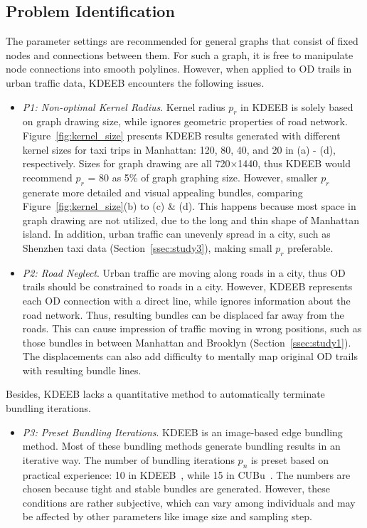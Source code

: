 \subsection{Problem Identification}
The parameter settings are recommended for general graphs that consist of fixed nodes and connections between them.
For such a graph, it is free to manipulate node connections into smooth polylines.
However, when applied to OD trails in urban traffic data, KDEEB encounters the following issues.

\begin{itemize}
\item
\textit{P1: Non-optimal Kernel Radius}.
Kernel radius $p_r$ in KDEEB is solely based on graph drawing size, while ignores geometric properties of road network.
Figure~\ref{fig:kernel_size} presents KDEEB results generated with different kernel sizes for taxi trips in Manhattan: 120, 80, 40, and 20 in (a) - (d), respectively.
Sizes for graph drawing are all 720$\times$1440, thus KDEEB would recommend $p_r$ = 80 as 5\% of graph graphing size.
However, smaller $p_r$ generate more detailed and visual appealing bundles, comparing Figure~\ref{fig:kernel_size}(b) to (c) \& (d).
This happens because most space in graph drawing are not utilized, due to the long and thin shape of Manhattan island.
In addition, urban traffic can unevenly spread in a city, such as Shenzhen taxi data (Section~\ref{ssec:study3}), making small $p_r$ preferable.

\vspace{1mm}
\item
\textit{P2: Road Neglect}.
Urban traffic are moving along roads in a city, thus OD trails should be constrained to roads in a city.
However, KDEEB represents each OD connection with a direct line, while ignores information about the road network.
Thus, resulting bundles can be displaced far away from the roads.
This can cause impression of traffic moving in wrong positions, such as those bundles in between Manhattan and Brooklyn (Section~\ref{ssec:study1}).
The displacements can also add difficulty to mentally map original OD trails with resulting bundle lines.
\end{itemize}

\vspace{2mm}
\noindent
Besides, KDEEB lacks a quantitative method to automatically terminate bundling iterations.

\begin{itemize}
\item
\textit{P3: Preset Bundling Iterations}.
KDEEB is an image-based edge bundling method. 
Most of these bundling methods generate bundling results in an iterative way. 
The number of bundling iterations $p_n$ is preset based on practical experience: 10 in KDEEB~\cite{hurter2012graph}, while 15 in CUBu~\cite{van2016cubu}.
The numbers are chosen because tight and stable bundles are generated.
However, these conditions are rather subjective, which can vary among individuals and may be affected by other parameters like image size and sampling step.
\end{itemize}

